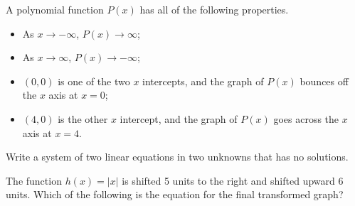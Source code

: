 \documentclass[11pt,answers]{exam}
\begin{document}
\begin{questions}


\question \label{question:queoca} A polynomial function $P(x)$  has all of the following properties.
\begin{itemize}
	\item As $x\to -\infty$, $P(x)\to \infty$;
	\item As $x\to \infty$, $P(x)\to -\infty$;
	\item $(0,0)$ is one of the two $x$ intercepts, and the graph of $P(x)$ bounces off the $x$ axis at $x=0$;
	\item $(4,0)$ is the other $x$ intercept, and the graph of $P(x)$ goes across the $x$ axis at $x=4$.
\end{itemize}
	\question[1]  Write a system of two linear equations in two unknowns that has no solutions.
	
	\fillwithdottedlines{1.5cm}

\question[1] The function $\displaystyle h(x)=|x|$ is shifted 5 units to the right and shifted upward 6 units. Which of the following is the equation for the final transformed graph?
	

\end{questions}
\end{document}
